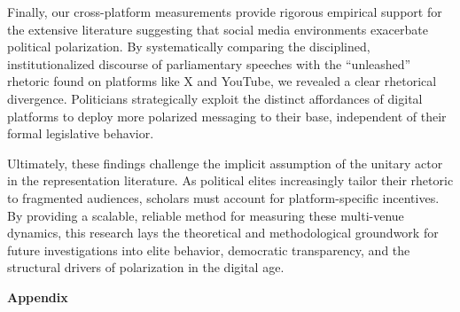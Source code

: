 \documentclass[11pt,letterpaper]{article}
\theoremstyle{plain}
\begin{document}
Finally, our cross-platform measurements provide rigorous empirical support for the extensive literature suggesting that social media environments exacerbate political polarization. By systematically comparing the disciplined, institutionalized discourse of parliamentary speeches with the ``unleashed'' rhetoric found on platforms like X and YouTube, we revealed a clear rhetorical divergence. Politicians strategically exploit the distinct affordances of digital platforms to deploy more polarized messaging to their base, independent of their formal legislative behavior.

Ultimately, these findings challenge the implicit assumption of the unitary actor in the representation literature. As political elites increasingly tailor their rhetoric to fragmented audiences, scholars must account for platform-specific incentives. By providing a scalable, reliable method for measuring these multi-venue dynamics, this research lays the theoretical and methodological groundwork for future investigations into elite behavior, democratic transparency, and the structural drivers of polarization in the digital age.


\newpage 
\appendix
\setcounter{equation}{0}
\setcounter{figure}{0}
\setcounter{table}{0}
\setcounter{section}{0}
\renewcommand {\theequation} {S\arabic{equation}}
\renewcommand {\thefigure} {S\arabic{figure}}
\renewcommand {\thetable} {S\arabic{table}}
\renewcommand {\thesection} {S\arabic{section}}


\begin{center}
  {\LARGE \bf Appendix} 
\end{center}
\end{document}

